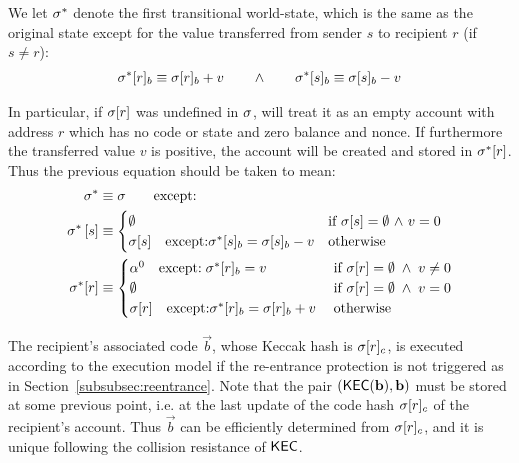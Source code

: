 We let $\mathbf{\sigma}^*$ denote the first transitional world-state, which is the same as the original state except for the value transferred from sender $s$ to recipient $r$ (if $s\ne r$):
\begin{align}
	\mathbf{\sigma}^*[r]_b\equiv \mathbf{\sigma}[r]_b+v \qquad \land  \qquad\mathbf{\sigma}^*[s]_b\equiv \mathbf{\sigma}[s]_b-v
	\label{state:first transitional}
\end{align}

In particular, if $\mathbf{\sigma}[r]$ was undefined in $\mathbf{\sigma}$, \name will treat it as an empty account with address $r$ which has no code or state and zero balance and nonce.
If furthermore the transferred value $v$ is positive, the account will be created and stored in $\mathbf{\sigma}^*[r]$. 
Thus the previous equation should be taken to mean:
\begin{align}
	\mathbf{\sigma}^* &\equiv \mathbf{\sigma} \qquad \mbox{except:}\\
	\mathbf{\sigma}^*\left[ s \right] &\equiv \begin{cases}
		\emptyset & \mbox{if $\mathbf{\sigma}[s]=\emptyset$ $\land$ $v=0$}\\
		\mathbf{\sigma}[s]\quad\mbox{except:}\mathbf{\sigma}^*[s]_b=\mathbf{\sigma}[s]_b-v & \mbox{otherwise}
	\end{cases}\\
	\mathbf{\sigma}^*[r] &\equiv \begin{cases}
		\mathbf{\alpha}^0 \quad\text{except:}\; \mathbf{\sigma}^*[r]_b=v  & \mbox{if $\mathbf{\sigma}[r]=\emptyset \;\land\; v\ne 0$}\\
		\emptyset & \mbox{if $\mathbf{\sigma}[r]=\emptyset \;\land\; v = 0$}\\
		\mathbf{\sigma}[r]\quad\mbox{except:}\mathbf{\sigma}^*[r]_b=\mathbf{\sigma}[r]_b+v\; & \mbox{otherwise}
	\end{cases}
\end{align}

The recipient's associated code $\vec{b}$, whose Keccak hash is $\mathbf{\sigma}[r]_c$, is executed according to the execution model if the re-entrance protection is not triggered as in Section~\ref{subsubsec:reentrance}.
Note that the pair $\left( \mathsf{KEC}(\mathbf{b}), \mathbf{b} \right)$ must be stored at some previous point, i.e. at the last update of the code hash $\mathbf{\sigma}[r]_c$ of the recipient's account. 
Thus $\vec{b}$ can be efficiently determined from $\mathbf{\sigma}[r]_c$,
and it is unique following the collision resistance of $\mathsf{KEC}$.

